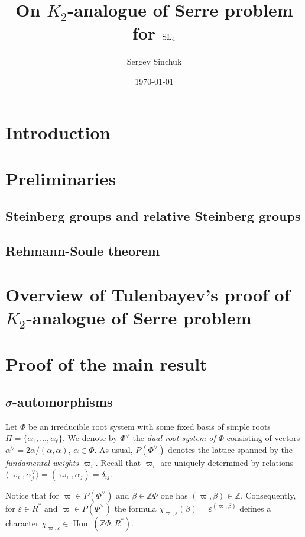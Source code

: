 \documentclass[oneside, 10pt]{amsart}
\title{On $K_2$-analogue of Serre problem for $\operatorname{SL}_4$}
\author {Sergey Sinchuk}
\date {\today}
\DeclareMathOperator{\Hom}{Hom}
\newcommand{\ZZ}{\mathbb{Z}}
\numberwithin{equation}{section}
\numberwithin{lemma}{section}
\theoremstyle{definition}
\theoremstyle{remark}
\begin{document}
   
\maketitle

\section{Introduction}

\section{Preliminaries}

\subsection{Steinberg groups and relative Steinberg groups}

\subsection{Rehmann-Soule theorem}

\section{Overview of Tulenbayev's proof of $K_2$-analogue of Serre problem}

\section{Proof of the main result}

\subsection{$\sigma$-automorphisms}
Let $\Phi$ be an irreducible root system with some fixed basis of simple roots $\Pi = \{\alpha_1, \ldots, \alpha_\ell\}$.
We denote by $\Phi^\vee$ the \emph{dual root system of $\Phi$} consisting of vectors $\alpha^\vee = 2\alpha/(\alpha, \alpha)$, $\alpha\in \Phi$.
As usual, $P(\Phi^\vee)$ denotes the lattice spanned by the \emph{fundamental weights $\varpi_i$}.
Recall that $\varpi_i$ are uniquely determined by relations $\langle\varpi_i, \alpha_j^\vee \rangle = (\varpi_i, \alpha_j) = \delta_{ij}.$

Notice that for $\varpi \in P(\Phi^\vee)$ and $\beta \in \ZZ \Phi$ one has $(\varpi, \beta) \in \ZZ $.
Consequently, for $\varepsilon \in R^*$ and $\varpi \in P(\Phi^\vee)$ the formula $\chi_{\varpi, \varepsilon}(\beta) = \varepsilon ^ {(\varpi, \beta)}$
defines a character $\chi_{\varpi, \varepsilon} \in \Hom(\ZZ \Phi, R^*)$.
\end{document}
